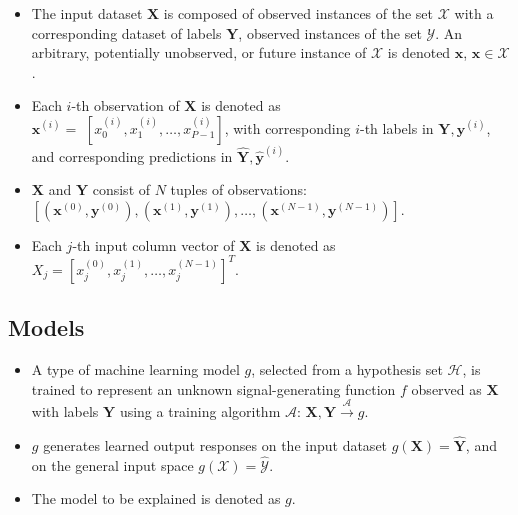 \documentclass[sigconf, review]{acmart}
\begin{document}
	\begin{itemize}
		\item The input dataset $\mathbf{X}$ is composed of observed instances of the set $\mathcal{X}$ with a corresponding dataset of labels $\mathbf{Y}$, observed instances of the set $\mathcal{Y}$. An arbitrary, potentially unobserved, or future instance of $\mathcal{X}$ is denoted $\mathbf{x}$, $\mathbf{x} \in \mathcal{X}$.
		\item Each $i$-th observation of $\mathbf{X}$ is denoted as\\ $\mathbf{x}^{(i)} = $  
		$[x_0^{(i)}, x_1^{(i)}, \dots, x_{\textit{P}-1}^{(i)}]$, with corresponding $i$-th labels in $\mathbf{Y}, \mathbf{y}^{(i)}$, and corresponding predictions in $\mathbf{\hat{Y}}, \mathbf{\hat{y}}^{(i)}$. %
		\item $\mathbf{X}$ and $\mathbf{Y}$ consist of $N$ tuples of observations:\\ $[(\mathbf{x}^{(0)},\mathbf{y}^{(0)}), (\mathbf{x}^{(1)},\mathbf{y}^{(1)}), \dots,(\mathbf{x}^{(N-1)},\mathbf{y}^{(N-1)})]$. %
		\item Each $j$-th input column vector of $\mathbf{X}$ is denoted as $X_j = [x_{j}^{(0)}, x_{j}^{(1)}, \dots, x_{j}^{(N-1)}]^T$.
	\end{itemize}	 

\subsection{Models}

	\begin{itemize}
		\item A type of machine learning model $g$, selected from a hypothesis set $\mathcal{H}$, is trained to represent an unknown signal-generating function $f$ observed as  $\mathbf{X}$ with labels $\mathbf{Y}$ using a training algorithm $\mathcal{A}$: 
		$ \mathbf{X}, \mathbf{Y} \xrightarrow{\mathcal{A}} g$.
		\item $g$ generates learned output responses on the input dataset $g(\mathbf{X}) = \mathbf{\hat{Y}}$, and on the general input space $g(\mathcal{X}) = \mathcal{\hat{Y}}$.
		\item The model to be explained is denoted as $g$.
	\end{itemize}

\end{document}
